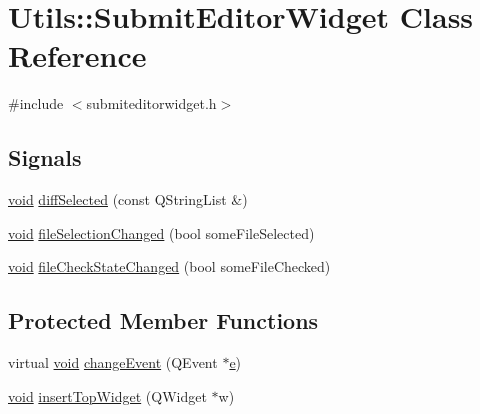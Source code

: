 \hypertarget{class_utils_1_1_submit_editor_widget}{\section{\-Utils\-:\-:\-Submit\-Editor\-Widget \-Class \-Reference}
\label{class_utils_1_1_submit_editor_widget}
}


{\ttfamily \#include $<$submiteditorwidget.\-h$>$}

\subsection*{\-Signals}
\begin{DoxyCompactItemize}
\item 
\hyperlink{group___u_a_v_objects_plugin_ga444cf2ff3f0ecbe028adce838d373f5c}{void} \hyperlink{class_utils_1_1_submit_editor_widget_a8c3e8a241b0d248a3f544bef7964b0a5}{diff\-Selected} (const \-Q\-String\-List \&)
\item 
\hyperlink{group___u_a_v_objects_plugin_ga444cf2ff3f0ecbe028adce838d373f5c}{void} \hyperlink{class_utils_1_1_submit_editor_widget_a08d39ccc85ccd77758b294635ff1f2b9}{file\-Selection\-Changed} (bool some\-File\-Selected)
\item 
\hyperlink{group___u_a_v_objects_plugin_ga444cf2ff3f0ecbe028adce838d373f5c}{void} \hyperlink{class_utils_1_1_submit_editor_widget_a162b229c57c72d8e16c834439991d208}{file\-Check\-State\-Changed} (bool some\-File\-Checked)
\end{DoxyCompactItemize}
\subsection*{\-Protected \-Member \-Functions}
\begin{DoxyCompactItemize}
\item 
virtual \hyperlink{group___u_a_v_objects_plugin_ga444cf2ff3f0ecbe028adce838d373f5c}{void} \hyperlink{class_utils_1_1_submit_editor_widget_a40268b62d83007572788f9071d0f4082}{change\-Event} (\-Q\-Event $\ast$\hyperlink{_o_p_plots_8m_a9425be9aab51621e317ba7ade564b570}{e})
\item 
\hyperlink{group___u_a_v_objects_plugin_ga444cf2ff3f0ecbe028adce838d373f5c}{void} \hyperlink{class_utils_1_1_submit_editor_widget_aed676670fabd92bf7fe3f71a7e441185}{insert\-Top\-Widget} (\-Q\-Widget $\ast$w)
\end{DoxyCompactItemize}


